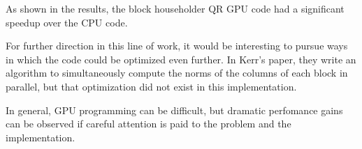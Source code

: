 \documentclass[12pt]{article}
\begin{document}
As shown in the results, the block householder QR GPU code had a significant speedup over 
the CPU code.

For further direction in this line of work, it would be interesting to pursue
ways in which the code could be optimized even further. In Kerr's paper, they write an
algorithm to simultaneously compute the norms of the columns of each block in parallel,
but that optimization did not exist in this implementation.

In general, GPU programming can be difficult, but dramatic perfomance gains can be
observed if careful attention is paid to the problem and the implementation.



\end{document}
